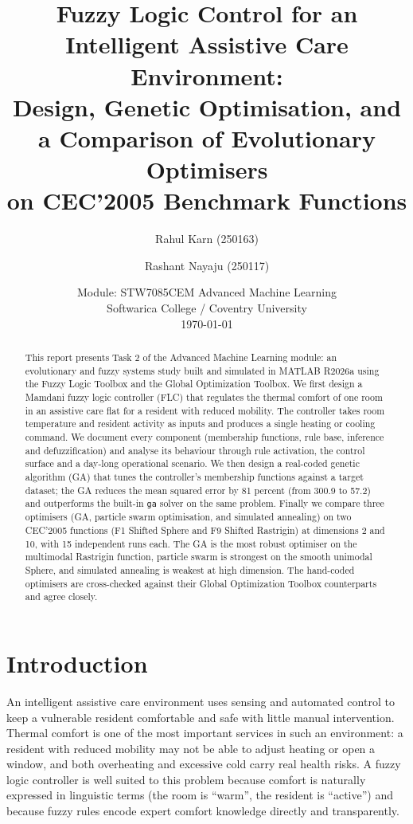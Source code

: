 \documentclass[11pt,a4paper]{article}
\title{\vspace{-1.2cm}\textbf{Fuzzy Logic Control for an Intelligent Assistive Care Environment:\\
Design, Genetic Optimisation, and a Comparison of Evolutionary Optimisers\\ on CEC'2005 Benchmark Functions}}
\author{Rahul Karn (250163) \and Rashant Nayaju (250117)}
\date{Module: STW7085CEM Advanced Machine Learning \\
Softwarica College / Coventry University \\
\today}
\begin{document}
\maketitle

\begin{abstract}
\noindent
This report presents Task 2 of the Advanced Machine Learning module: an evolutionary and fuzzy
systems study built and simulated in MATLAB R2026a using the Fuzzy Logic Toolbox and the Global
Optimization Toolbox. We first design a Mamdani fuzzy logic controller (FLC) that regulates the
thermal comfort of one room in an assistive care flat for a resident with reduced mobility. The
controller takes room temperature and resident activity as inputs and produces a single heating or
cooling command. We document every component (membership functions, rule base, inference and
defuzzification) and analyse its behaviour through rule activation, the control surface and a
day-long operational scenario. We then design a real-coded genetic algorithm (GA) that tunes the
controller's membership functions against a target dataset; the GA reduces the mean squared error by
81 percent (from 300.9 to 57.2) and outperforms the built-in \texttt{ga} solver on the same problem.
Finally we compare three optimisers (GA, particle swarm optimisation, and simulated annealing) on two
CEC'2005 functions (F1 Shifted Sphere and F9 Shifted Rastrigin) at dimensions 2 and 10, with 15
independent runs each. The GA is the most robust optimiser on the multimodal Rastrigin function,
particle swarm is strongest on the smooth unimodal Sphere, and simulated annealing is weakest at high
dimension. The hand-coded optimisers are cross-checked against their Global Optimization Toolbox
counterparts and agree closely.
\end{abstract}

\section{Introduction}
An intelligent assistive care environment uses sensing and automated control to keep a vulnerable
resident comfortable and safe with little manual intervention. Thermal comfort is one of the most
important services in such an environment: a resident with reduced mobility may not be able to adjust
heating or open a window, and both overheating and excessive cold carry real health risks. A fuzzy
logic controller is well suited to this problem because comfort is naturally expressed in linguistic
terms (the room is ``warm'', the resident is ``active'') and because fuzzy rules encode expert comfort
knowledge directly and transparently.
\end{document}
